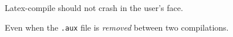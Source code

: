 \documentclass{article}
\begin{document}
Latex-compile should not crash in the user's face.

Even when the \texttt{.aux} file is \emph{removed} between two compilations.

\bigskip
\cite{key}
\bigskip

\printbibliography
\end{document}

